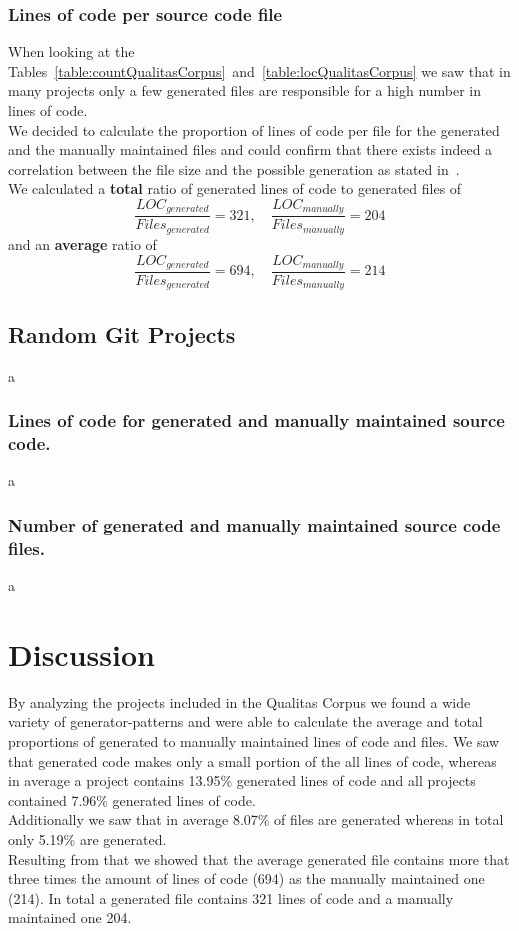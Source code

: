 

\subsubsection{Lines of code per source code file}
When looking at the Tables~\ref{table:countQualitasCorpus}~and~\ref{table:locQualitasCorpus} we saw that in many projects only a few generated files are responsible for a high number in lines of code.\\
We decided to calculate the proportion of lines of code per file for the generated and the manually maintained files and could confirm that there exists indeed a correlation between the file size and the possible generation as stated in~\cite{Bernwieser2014}.\\
We calculated a \textbf{total} ratio of generated lines of code to generated files of 
\begin{equation}
	\frac{LOC_{generated}}{Files_{generated}} = 321 , \quad \frac{LOC_{manually}}{Files_{manually}} = 204
\end{equation}
and an \textbf{average} ratio of
\begin{equation}
	\frac{LOC_{generated}}{Files_{generated}} = 694 , \quad \frac{LOC_{manually}}{Files_{manually}} = 214
\end{equation}

\subsection{Random Git Projects}
a
\subsubsection{Lines of code for generated and manually maintained source code.}
a
\subsubsection{Number of generated and manually maintained source code files.}
a
\section{Discussion}
By analyzing the projects included in the Qualitas Corpus we found a wide variety of generator-patterns and were able to calculate the average and total proportions of generated to manually maintained lines of code and files. We saw that generated code makes only a small portion of the all lines of code, whereas in average a project contains 13.95\% generated lines of code and all projects contained 7.96\% generated lines of code.\\
Additionally we saw that in average 8.07\% of files are generated whereas in total only 5.19\% are generated.\\
Resulting from that we showed that the average generated file contains more that three times the amount of lines of code (694) as the manually maintained one (214). In total a generated file contains 321 lines of code and a manually maintained one 204.

